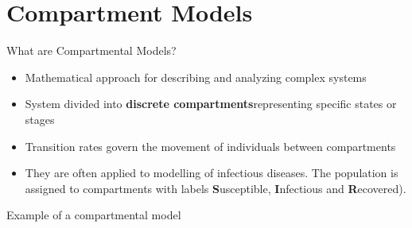 \section{Compartment Models}
\begin{frame}{What are Compartmental Models?}
  \begin{itemize}
    \item Mathematical approach for describing and analyzing complex systems
    \item System divided into \textbf{discrete compartments}representing specific states or stages
    \item Transition rates govern the movement of individuals between compartments
    \item They are often applied to modelling of infectious diseases. The population is assigned to compartments with labels \textbf{S}usceptible, \textbf{I}nfectious and \textbf{R}ecovered).
  \end{itemize}
\pause
\vfill
Example of a compartmental model
\begin{center}
    

\end{center}

\end{frame}

